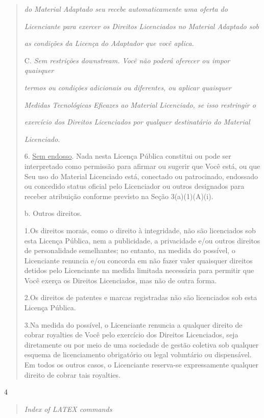 \documentclass[
]{article}
\begin{document}
\begin{quote}
\emph{do Material Adaptado seu recebe automaticamente uma oferta do}

\emph{Licenciante para exercer os Direitos Licenciados no Material
Adaptado sob}

\emph{as condições da Licença do Adaptador que você aplica.}

C. \emph{Sem restrições downstream. Você não poderá oferecer ou impor
quaisquer}

\emph{termos ou condições adicionais ou diferentes, ou aplicar
quaisquer}

\emph{Medidas Tecnológicas Eficazes ao Material Licenciado, se isso
restringir o}

\emph{exercício dos Direitos Licenciados por qualquer destinatário do
Material}

\emph{Licenciado.}

6. \uline{Sem endosso}. Nada nesta Licença Pública constitui ou pode ser
interpretado como permissão para afirmar ou sugerir que Você está, ou
que Seu uso do Material Licenciado está, conectado ou patrocinado,
endossado ou concedido status oficial pelo Licenciador ou outros
designados para receber atribuição conforme previsto na Seção
3(a)(1)(A)(i).

b. Outros direitos.

1.Os direitos morais, como o direito à integridade, não são licenciados
sob esta Licença Pública, nem a publicidade, a privacidade e/ou outros
direitos de personalidade semelhantes; no entanto, na medida do
possível, o Licenciante renuncia e/ou concorda em não fazer valer
quaisquer direitos detidos pelo Licenciante na medida limitada
necessária para permitir que Você exerça os Direitos Licenciados, mas
não de outra forma.

2.Os direitos de patentes e marcas registradas não são licenciados sob
esta Licença Pública.

3.Na medida do possível, o Licenciante renuncia a qualquer direito de
cobrar royalties de Você pelo exercício dos Direitos Licenciados, seja
diretamente ou por meio de uma sociedade de gestão coletiva sob qualquer
esquema de licenciamento obrigatório ou legal voluntário ou dispensável.
Em todos os outros casos, o Licenciante reserva-se expressamente
qualquer direito de cobrar tais royalties.
\end{quote}

4

\begin{quote}
\emph{Index of LATEX commands}
\end{quote}
\end{document}
